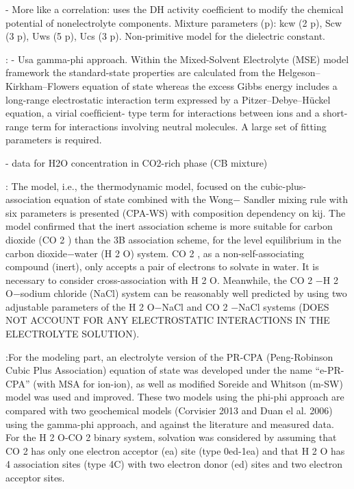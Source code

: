 - More like a correlation: uses the DH activity coefficient to modify the chemical potential of nonelectrolyte components. Mixture parameters (p): kcw (2 p), Scw (3 p), Uws (5 p), Ucs (3 p). Non-primitive model for the dielectric constant.


\cite{Springer2012}: - Usa gamma-phi approach. Within the Mixed-Solvent Electrolyte
(MSE) model framework the standard-state properties are
calculated from the Helgeson–Kirkham–Flowers equation of state whereas the excess Gibbs energy includes a long-range electrostatic interaction term expressed by a Pitzer–Debye–Hückel equation, a virial coefﬁcient-
type term for interactions between ions and a short-range term for interactions involving neutral molecules. A large set of fitting parameters is required.

- data for H2O concentration in CO2-rich phase (CB mixture)



\cite{Bian2019}: The model, i.e., the thermodynamic model, focused on
the cubic-plus-association equation of state combined with the Wong−
Sandler mixing rule with six parameters is presented (CPA-WS) with composition dependency on kij. The model conﬁrmed that the inert association scheme is more suitable for carbon dioxide (CO 2 ) than the 3B association scheme, for the level equilibrium in the carbon dioxide−water (H 2 O) system. CO 2 , as a non-self-associating compound (inert), only accepts a pair of electrons to solvate in water. It is necessary to consider cross-association with H 2 O. Meanwhile, the CO 2 −H 2 O−sodium chloride (NaCl) system can be reasonably well predicted by using two adjustable parameters of the H 2 O−NaCl and CO 2 −NaCl systems (DOES NOT ACCOUNT FOR ANY ELECTROSTATIC INTERACTIONS IN THE ELECTROLYTE SOLUTION).


\cite{Chabab2019}:For the modeling part, an electrolyte version of the PR-CPA (Peng-Robinson Cubic Plus Association) equation of state was developed under the name “e-PR-CPA” (with MSA for ion-ion), as well as modified Soreide and Whitson (m-SW) model was used and improved. These two models using the phi-phi approach are compared with two geochemical models (Corvisier 2013 and Duan el al. 2006) using the gamma-phi approach, and against the literature and measured data. For the H 2 O-CO 2 binary system, solvation was considered by assuming that CO 2 has only one electron acceptor (ea) site (type 0ed-1ea) and that H 2 O has 4 association sites (type 4C) with two electron donor (ed) sites and two electron acceptor sites.

